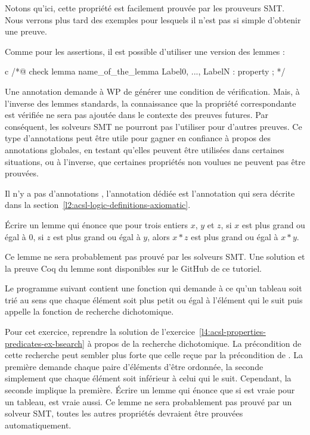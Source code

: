 Notons qu'ici, cette propriété est facilement prouvée par les prouveurs SMT. Nous
verrons plus tard des exemples pour lesquels il n'est pas si simple d'obtenir une
preuve.




Comme pour les assertions, il est possible d'utiliser une version
 des lemmes :


\begin{CodeBlock}{c}
/*@
  check lemma name_of_the_lemma { Label0, ..., LabelN }:
    property ;
*/
\end{CodeBlock}


Une annotation  demande à WP de générer une condition de
vérification. Mais, à l'inverse des lemmes standards, la connaissance que la
propriété correspondante est vérifiée ne sera pas ajoutée dans le contexte des
preuves futures. Par conséquent, les solveurs SMT ne pourront pas l'utiliser
pour d'autres preuves. Ce type d'annotations peut être utile pour gagner en
confiance à propos des annotations globales, en testant qu'elles peuvent être
utilisées dans certaines situations, ou à l'inverse, que certaines propriétés
non voulues ne peuvent pas être prouvées.


Il n'y a pas d'annotations , l'annotation dédiée est
l'annotation  qui sera décrite dans la
section~\ref{l2:acsl-logic-definitions-axiomatic}.





Écrire un lemme qui énonce que pour trois entiers $x$, $y$ et $z$, si $x$ est
plus grand ou égal à $0$, si $z$ est plus grand ou égal à $y$, alors $x * z$
est  plus grand ou égal à $x * y$.


Ce lemme ne sera probablement pas prouvé par les solveurs SMT. Une solution et
la preuve Coq du lemme sont disponibles sur le GitHub de ce tutoriel.

\label{l4:acsl-properties-lemmas-lsorted-gsorted}


Le programme suivant contient une fonction qui demande à ce qu'un tableau soit
trié au sens que chaque élément soit plus petit ou égal à l'élément qui le suit
puis appelle la fonction de recherche dichotomique.




Pour cet exercice, reprendre la solution de
l'exercice~\ref{l4:acsl-properties-predicates-ex-bsearch} à propos de la recherche
dichotomique. La précondition de cette recherche peut sembler plus forte que celle
reçue par la précondition de . La première demande
chaque paire d'éléments d'être ordonnée, la seconde simplement que chaque élément
soit inférieur à celui qui le suit. Cependant, la seconde implique la première.
Écrire un lemme qui énonce que si  est vraie
pour un tableau,  est vraie aussi. Ce lemme ne sera probablement
pas prouvé par un solveur SMT, toutes les autres propriétés devraient être prouvées
automatiquement.


